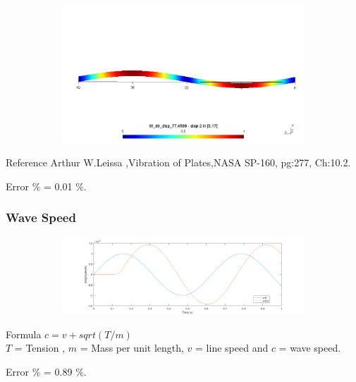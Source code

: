\documentclass[9pt]{beamer}
\begin{document}
\begin{frame}
\begin{figure}[h!]
\begin{subfigure}{.8\textwidth}
\includegraphics[width=\linewidth,trim={0 8cm 0 8cm},clip]{NAS277_pos_3.png}
\end{subfigure}

\end{figure}

\begin{block}{Reference}
Arthur W.Leissa ,Vibration of Plates,NASA SP-160, pg:277, Ch:10.2. \\
\end{block}
Error $\%$ = 0.01 $\%$.



\end{frame}



\begin{frame}
\frametitle{Wave Speed}


\begin{figure}[h!]
\centering
\begin{subfigure}{1\textwidth}
\includegraphics[width=\linewidth,trim={0 0 0 0},clip]{wavespeed.png}
\end{subfigure} 

\end{figure}

\begin{block}{Formula}
$c=v+sqrt(T/m)$ \\  $T$ = Tension , $m$ = Mass per unit length, $v$ = line speed and $c$ = wave speed. 
\end{block}
Error $\%$ = 0.89 $\%$.

\end{frame}
\end{document}
